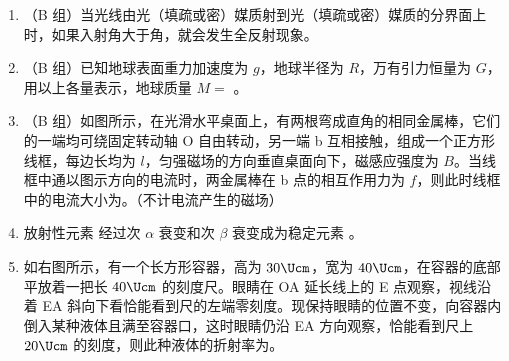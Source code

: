 \documentclass[\gkver]{gaokaozhenti}
\begin{document}
\begin{enumerate}
\item
（B 组）当光线由光（填疏或密）媒质射到光（填疏或密）媒质的分界面上时，如果入射角大于角，就会发生全反射现象。

\item
（B 组）已知地球表面重力加速度为 $g$，地球半径为 $R$，万有引力恒量为 $G$，用以上各量表示，地球质量 $M =$ 。

\item
（B 组）如图所示，在光滑水平桌面上，有两根弯成直角的相同金属棒，它们的一端均可绕固定转动轴 O 自由转动，另一端 b 互相接触，组成一个正方形线框，每边长均为 $l$，匀强磁场的方向垂直桌面向下，磁感应强度为 $B$。当线框中通以图示方向的电流时，两金属棒在 b 点的相互作用力为 $f$，则此时线框中的电流大小为。（不计电流产生的磁场）
\onepicture[h=5.5cm, align=right]{}

\item
放射性元素  经过次 $\alpha$ 衰变和次 $\beta$ 衰变成为稳定元素 。

\item
如右图所示，有一个长方形容器，高为 $30\Ucm$，宽为 $40\Ucm$，在容器的底部平放着一把长 $40\Ucm$ 的刻度尺。眼睛在 OA 延长线上的 E 点观察，视线沿着 EA 斜向下看恰能看到尺的左端零刻度。现保持眼睛的位置不变，向容器内倒入某种液体且满至容器口，这时眼睛仍沿 EA 方向观察，恰能看到尺上 $20\Ucm$ 的刻度，则此种液体的折射率为。
\onepicture[w=5cm, align=right]{}


\end{enumerate}
\end{document}
